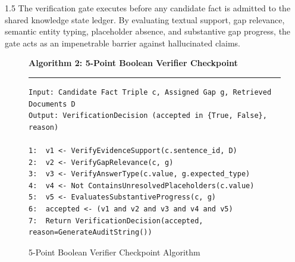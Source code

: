 \documentclass[12pt,a4paper]{report}
\begin{document}
\begin{spacing}{1.5}
The verification gate executes before any candidate fact is admitted to the shared knowledge state ledger. By evaluating textual support, gap relevance, semantic entity typing, placeholder absence, and substantive gap progress, the gate acts as an impenetrable barrier against hallucinated claims.

\begin{figure}[!htbp]
\centering
\begin{mdframed}[backgroundcolor=codebg,linecolor=codeframe,roundcorner=3pt]
\textbf{Algorithm 2: 5-Point Boolean Verifier Checkpoint}
\vspace{0.15cm}
\hrule
\vspace{0.15cm}
\fontsize{8.5}{11}\selectfont
\begin{verbatim}
Input: Candidate Fact Triple c, Assigned Gap g, Retrieved Documents D
Output: VerificationDecision (accepted in {True, False}, reason)

1:  v1 <- VerifyEvidenceSupport(c.sentence_id, D)
2:  v2 <- VerifyGapRelevance(c, g)
3:  v3 <- VerifyAnswerType(c.value, g.expected_type)
4:  v4 <- Not ContainsUnresolvedPlaceholders(c.value)
5:  v5 <- EvaluatesSubstantiveProgress(c, g)
6:  accepted <- (v1 and v2 and v3 and v4 and v5)
7:  Return VerificationDecision(accepted, reason=GenerateAuditString())
\end{verbatim}
\end{mdframed}
\caption{5-Point Boolean Verifier Checkpoint Algorithm}
\label{alg:verifier}
\end{figure}
\end{spacing}
\end{document}
